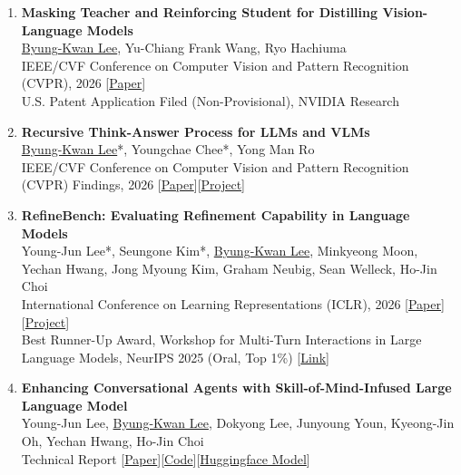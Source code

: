 \documentclass[a4paper,11pt]{article}
\begin{document}
{\begin{enumerate}[leftmargin=2.2em, labelsep=0.6em, align=left, itemindent=0em, label={\color{accentDark}\textbf{\arabic*.}}]
\item \textbf{Masking Teacher and Reinforcing Student for Distilling Vision-Language Models}
\\\vspace{1mm}\underline{Byung-Kwan Lee}, Yu-Chiang Frank Wang, Ryo Hachiuma
\\\vspace{2mm}IEEE/CVF Conference on Computer Vision and Pattern Recognition (CVPR), 2026 [\href{https://www.arxiv.org/abs/2512.22238}{Paper}]
\\\vspace{2mm}U.S. Patent Application Filed (Non-Provisional), NVIDIA Research

\item \textbf{Recursive Think-Answer Process for LLMs and VLMs}
\\\vspace{1mm}\underline{Byung-Kwan Lee}*, Youngchae Chee*, Yong Man Ro
\\\vspace{2mm}IEEE/CVF Conference on Computer Vision and Pattern Recognition (CVPR) Findings, 2026 [\href{https://arxiv.org/abs/2603.02099}{Paper}][\href{https://litcoderr.github.io/rtap_page/}{Project}]

\item \textbf{RefineBench: Evaluating Refinement Capability in Language Models}
\\\vspace{1mm}Young-Jun Lee*, Seungone Kim*, \underline{Byung-Kwan Lee}, Minkyeong Moon, Yechan Hwang, Jong Myoung Kim, Graham Neubig, Sean Welleck, Ho-Jin Choi
\\\vspace{2mm}International Conference on Learning Representations (ICLR), 2026 [\href{https://arxiv.org/abs/2511.22173}{Paper}][\href{https://passing2961.github.io/refinebench-page/}{Project}]
\\\vspace{2mm}Best Runner-Up Award, Workshop for Multi-Turn Interactions in Large Language Models, NeurIPS 2025 (Oral, Top 1\%) [\href{https://neurips.cc/virtual/2025/loc/san-diego/130841}{Link}]

\item \textbf{Enhancing Conversational Agents with Skill-of-Mind-Infused Large Language Model}
\\\vspace{1mm}Young-Jun Lee, \underline{Byung-Kwan Lee}, Dokyong Lee, Junyoung Youn, Kyeong-Jin Oh, Yechan Hwang, Ho-Jin Choi
\\\vspace{2mm}Technical Report [\href{https://openreview.net/forum?id=SjAKLyCvmC}{Paper}][\href{https://github.com/passing2961/Thanos}{Code}][\href{https://huggingface.co/collections/passing2961/thanos-6711f7a74227c6088d5d88f8}{Huggingface Model}]


\end{enumerate}}
\end{document}
